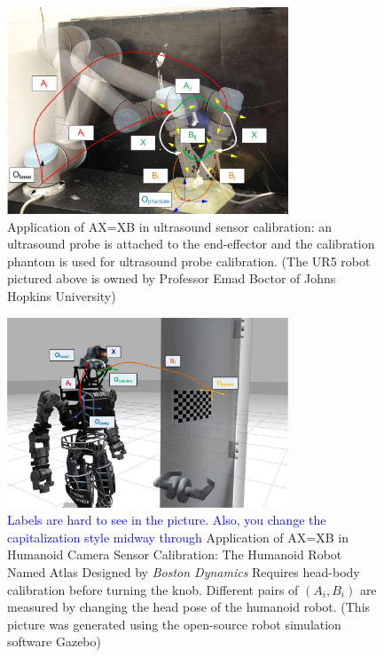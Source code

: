 \documentclass[twocolumn,10pt]{asme2ej}
\begin{document}
\begin{figure}[t]
\centering
\includegraphics[width=3.3in]{Photos/UR5_Frame_Final.jpg}
\caption{Application of AX=XB in ultrasound sensor calibration: an ultrasound probe is attached to the end-effector and the calibration phantom is used for ultrasound probe calibration. (The UR5 robot pictured above is owned by Professor Emad Boctor of Johns Hopkins University)}
\label{AXXBfig2}
\end{figure}

\begin{figure}[t]
\centering
\includegraphics[width=3.3in]{Photos/Robot_Patern.jpg}
\caption{\textcolor{blue}{Labels are hard to see in the picture. Also, you change the capitalization style midway through} Application of AX=XB in Humanoid Camera Sensor Calibration: The Humanoid Robot Named Atlas Designed by %
 \textit{Boston Dynamics} Requires head-body calibration before turning the knob. Different pairs of $(A_i, B_i)$ are measured by changing the head pose of the humanoid robot. (This picture was generated using the open-source robot simulation software Gazebo)}
\label{AXXBfig3}
\end{figure}
\end{document}
